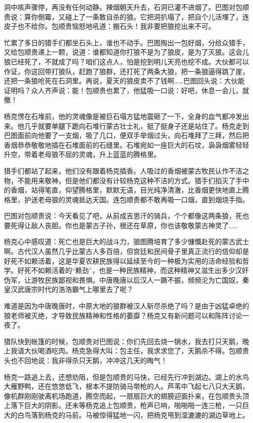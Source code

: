 \par 洞中咳声骤停，再没有任何动静。辣烟朝天升去，石洞已灌不进烟了。巴图对包顺贵说：算你倒霉，又碰上了一条敢自杀的狼。它把洞扒塌了，把自个儿活埋了，连皮子也不给你。包顺贵恼怒地吼道：搬石头！我非要把狼挖出来不可。
\par 忙累了多日的猎手们都坐石头上，谁也不动手。巴图掏出一包好烟，分给众猎手，又给包顺贵递上一颗，说道：谁都知道你打狼不是为了狼皮，是为了灭狼。这会儿狼已经死了，不就成了吗？咱们这点人，怕是挖到明儿天亮也挖不成。大伙都可以作证，你这回带打狼队，赶跑了狼群，还打死了两条大狼，把一条狼逼得跳了崖，还把一条狼呛死在石洞里。再说，夏天的狼皮卖不了钱啊……巴图回头说：大伙能证明吗？众人齐声说：能！包顺贵也累了，他猛吸一口说：好吧，休息一会儿，就撤！
\par 杨克愣在石堆前，他的灵魂像是被巨石塌方猛地震砸了一下，全身的血气都冲发出来。他几乎就要单腿下跪向石堆行蒙古壮士礼，挺了挺身子还是站住了。杨克走到巴图面前向他要了一支烟，吸了几口，便双手举烟过头，向石堆拜了三拜，然后把香烟恭恭敬敬地插在石堆面前的石缝里。石堆宛如一座巨大的石坟，袅袅烟雾轻轻升空，带着老母狼不屈的灵魂，升上蓝蓝的腾格里。
\par 猎手们都站了起来，他们没有跟着杨克插香。人吸过的香烟被蒙古牧民认作不洁之物，不能用来敬神，但是他们都没有计较杨克这种不洁的方式。猎手们掐灭了手中的香烟，站得笔直，仰望腾格里，默默无语，目光纯净清澈，比香烟更快地直上腾格里，护送老母狼的灵魂抵达天国。连包顺贵都不敢再吸一口烟，直到烟烧手指。
\par 巴图对包顺贵说：今天看见了吧，从前成吉思汗的骑兵，个个都像这两条狼，死也要死得让敌人丧胆。你也是蒙古子孙，根还在草原，你也该敬敬蒙古神灵了……
\par 杨克心中感叹道：死亡也是巨大的战斗力，狼图腾培育了多少慷慨赴死的蒙古武士啊。古代汉人虽然几乎比蒙古人多百倍，但宫廷和民间骨子里真正流行的信仰却是好死不如赖活着，这是华夏农耕民族得以延续至今的一种极为实用的活命经验和哲学。好死不如赖活着的“赖劲”，也是一种民族精神，而这种精神又滋生出多少汉奸伪军，让游牧民族鄙视和畏惧。中唐晚唐以后汉人一蹶不振，频频沦为亡国奴，秦皇汉武唐宗时代的浩浩霸气上哪里去了呢？
\par 难道是因为中唐晚唐时，中原大地的狼群被汉人斩尽杀绝了吗？是由于凶猛卓绝的狼老师被灭绝，才导致民族精神和性格的萎靡？杨克又有新问题可以和陈阵讨论一夜了。
\par 
\par 猎队快到帐篷的时候，包顺贵对巴图说：你们先回去烧一锅水，我去打只天鹅，晚上我请大伙喝酒吃肉。杨克急得大叫：包主任，我求求您了，天鹅杀不得。包顺贵头也不回地说：我非得杀只天鹅，冲冲这几天的晦气！
\par 杨克一路追上去，还想劝阻，但是包顺贵的马快，已经先行冲到湖边。湖上的水鸟大雁野鸭，还在悠悠低飞，根本不提防骑马带枪的人。芦苇中飞起七八只大天鹅，像机群刚刚驶离机场跑道，腾空而起，一扇扇巨大的翅膀迎面扑来，在包顺贵头顶上落下巨大的阴影。还未等杨克追上包顺贵，枪声已响，啪啪啪一连三枪，一只巨大的白鸟落到杨克的马前。马被惊得猛地一闪，把杨克甩到湿漉漉的湖边草地上。
